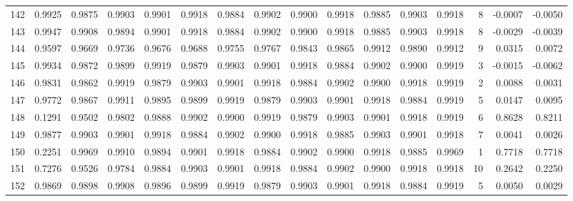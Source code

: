\begin{tabular}{lrrrrrrrrrrrrrrr}
142 &      0.9925 &  0.9875 &  0.9903 &  0.9901 &  0.9918 &  0.9884 &  0.9902 &  0.9900 &  0.9918 &  0.9885 &   0.9903 &     0.9918 &      8 &                   -0.0007 &                    -0.0050 \\
143 &      0.9947 &  0.9908 &  0.9894 &  0.9901 &  0.9918 &  0.9884 &  0.9902 &  0.9900 &  0.9918 &  0.9885 &   0.9903 &     0.9918 &      8 &                   -0.0029 &                    -0.0039 \\
144 &      0.9597 &  0.9669 &  0.9736 &  0.9676 &  0.9688 &  0.9755 &  0.9767 &  0.9843 &  0.9865 &  0.9912 &   0.9890 &     0.9912 &      9 &                    0.0315 &                     0.0072 \\
145 &      0.9934 &  0.9872 &  0.9899 &  0.9919 &  0.9879 &  0.9903 &  0.9901 &  0.9918 &  0.9884 &  0.9902 &   0.9900 &     0.9919 &      3 &                   -0.0015 &                    -0.0062 \\
146 &      0.9831 &  0.9862 &  0.9919 &  0.9879 &  0.9903 &  0.9901 &  0.9918 &  0.9884 &  0.9902 &  0.9900 &   0.9918 &     0.9919 &      2 &                    0.0088 &                     0.0031 \\
147 &      0.9772 &  0.9867 &  0.9911 &  0.9895 &  0.9899 &  0.9919 &  0.9879 &  0.9903 &  0.9901 &  0.9918 &   0.9884 &     0.9919 &      5 &                    0.0147 &                     0.0095 \\
148 &      0.1291 &  0.9502 &  0.9802 &  0.9888 &  0.9902 &  0.9900 &  0.9919 &  0.9879 &  0.9903 &  0.9901 &   0.9918 &     0.9919 &      6 &                    0.8628 &                     0.8211 \\
149 &      0.9877 &  0.9903 &  0.9901 &  0.9918 &  0.9884 &  0.9902 &  0.9900 &  0.9918 &  0.9885 &  0.9903 &   0.9901 &     0.9918 &      7 &                    0.0041 &                     0.0026 \\
150 &      0.2251 &  0.9969 &  0.9910 &  0.9894 &  0.9901 &  0.9918 &  0.9884 &  0.9902 &  0.9900 &  0.9918 &   0.9885 &     0.9969 &      1 &                    0.7718 &                     0.7718 \\
151 &      0.7276 &  0.9526 &  0.9784 &  0.9884 &  0.9903 &  0.9901 &  0.9918 &  0.9884 &  0.9902 &  0.9900 &   0.9918 &     0.9918 &     10 &                    0.2642 &                     0.2250 \\
152 &      0.9869 &  0.9898 &  0.9908 &  0.9896 &  0.9899 &  0.9919 &  0.9879 &  0.9903 &  0.9901 &  0.9918 &   0.9884 &     0.9919 &      5 &                    0.0050 &                     0.0029 \\

\end{tabular}
